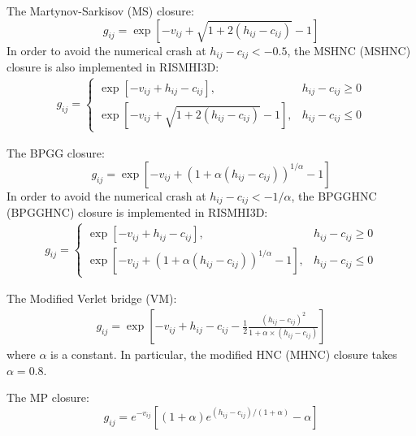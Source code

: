 \documentclass[aip,amsmath,amssymb,reprint,onecolumn]{revtex4-1}
\begin{document}
The Martynov-Sarkisov (MS) closure:
\begin{equation}\label{eq:MS}
    g_{ij} = \exp\left[ -v_{ij} + \sqrt{1 + 2(h_{ij} - c_{ij})} - 1\right]
\end{equation}
In order to avoid the numerical crash at $h_{ij} - c_{ij}<-0.5$, the MSHNC (MSHNC) closure is also implemented in RISMHI3D:
\begin{equation}\begin{split}\label{eq:MSHNC}
    g_{ij} = \begin{cases}
        \exp\left[-v_{ij}+h_{ij}-c_{ij}\right], &h_{ij}-c_{ij}\ge 0\\
        \exp\left[ -v_{ij} + \sqrt{1 + 2(h_{ij} - c_{ij})} - 1\right], &h_{ij}-c_{ij}\le 0
    \end{cases}
\end{split}\end{equation}

The BPGG closure:
\begin{equation}\label{eq:BPGG}
    g_{ij} = \exp\left[ -v_{ij} + \left(1 + \alpha(h_{ij} - c_{ij})\right)^{1/\alpha} - 1\right]
\end{equation}
In order to avoid the numerical crash at $h_{ij} - c_{ij}<-1/\alpha$, the BPGGHNC (BPGGHNC) closure is implemented in RISMHI3D:
\begin{equation}\begin{split}\label{eq:BPGGHNC}
    g_{ij} = \begin{cases}
        \exp\left[-v_{ij}+h_{ij}-c_{ij}\right], &h_{ij}-c_{ij}\ge 0\\
        \exp\left[ -v_{ij} + \left(1 + \alpha(h_{ij} - c_{ij})\right)^{1/\alpha} - 1\right], &h_{ij}-c_{ij}\le 0
    \end{cases}
\end{split}\end{equation}

The Modified Verlet bridge (VM):
\begin{equation}\begin{split}\label{eq:VM-and-MHNC}
    g_{ij} = \exp\left[-v_{ij} + h_{ij} - c_{ij} - \frac{1}{2}\frac{(h_{ij}-c_{ij})^2}{1 + \alpha\times(h_{ij}-c_{ij})}\right]
\end{split}\end{equation}
where $\alpha$ is a constant. In particular, the modified HNC (MHNC) closure takes $\alpha=0.8$.

The MP closure:
\begin{equation}\label{eq:MP}
    g_{ij} = e^{-v_{ij}}\left[ (1+\alpha)e^{(h_{ij}-c_{ij})/(1+\alpha)} - \alpha \right]
\end{equation}
\end{document}
